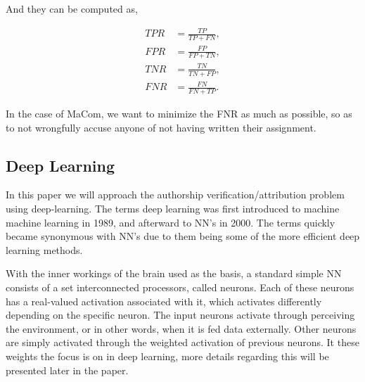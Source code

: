 And they can be computed as,

\begin{align}
    TPR &= \frac{TP}{TP + FN}, \\
    FPR &= \frac{FP}{FP + TN}, \\
    TNR &= \frac{TN}{TN + FP}, \\
    FNR &= \frac{FN}{FN + TP}.
\end{align}

In the case of MaCom, we want to minimize the \gls{FNR} as much as possible, so
as to not wrongfully accuse anyone of not having written their assignment.


\subsection{Deep Learning}

In this paper we will approach the authorship verification/attribution problem
using deep-learning. The terms deep learning was first introduced to machine
machine learning in 1989, and afterward to \gls{NN}'s in 2000. The terms quickly
became synonymous with \gls{NN}'s due to them being some of the more efficient
deep learning methods.\cite{Schmidhuber:2015}

With the inner workings of the brain used as the basis, a standard simple
\gls{NN} consists of a set interconnected processors, called neurons. Each
of these neurons has a real-valued activation associated with it, which
activates differently depending on the specific neuron. The input neurons
activate through perceiving the environment, or in other words, when it
is fed data externally. Other neurons are simply activated through the
weighted activation of previous neurons. It these weights the focus is on in
deep learning, more details regarding this will be presented later in the
paper.\cite{DBLP:journals/corr/Schmidhuber14}

